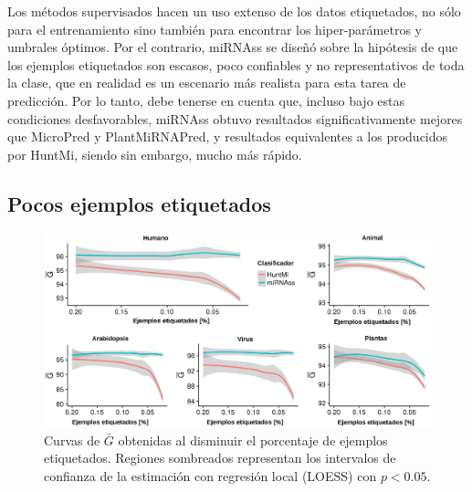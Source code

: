 Los métodos supervisados hacen un uso extenso de los datos etiquetados, no sólo para el entrenamiento sino también para encontrar los hiper-parámetros
y umbrales óptimos. Por el contrario, miRNAss se diseñó sobre la hipótesis de que los ejemplos etiquetados son escasos, poco confiables y no
representativos de toda la clase, que en realidad es un escenario más realista para esta tarea de predicción. Por lo tanto, debe tenerse en cuenta que,
incluso bajo estas condiciones desfavorables, miRNAss obtuvo resultados significativamente mejores que MicroPred y PlantMiRNAPred, y resultados equivalentes a
los producidos por HuntMi, siendo sin embargo, mucho más rápido.

\subsection{Pocos ejemplos etiquetados}

\begin{figure}[t]
	\centering
	\includegraphics[width=\linewidth]{fig/few_labeled-huntmi.eps}
	\caption[$\bar{G}$ con pocos ejemplos de entrenamiento]{Curvas de $\bar{G}$ obtenidas al disminuir el porcentaje de ejemplos etiquetados. Regiones
		sombreados representan los intervalos de confianza de la estimación con regresión local (LOESS) con $p < 0.05$.}
	\label{fig:fewSamples:huntmi}
\end{figure}

